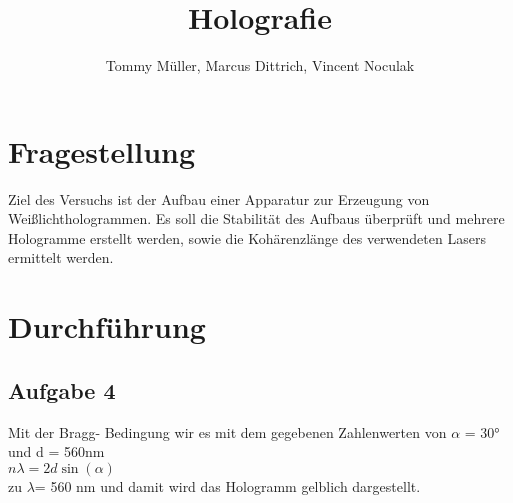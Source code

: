 \documentclass[10pt,a4paper]{article}
\author{Tommy Müller, Marcus Dittrich, Vincent Noculak}
\title{Holografie}
\begin{document}
\section{Fragestellung}

Ziel des Versuchs ist der Aufbau einer Apparatur zur Erzeugung von Weißlichthologrammen. Es soll die Stabilität des Aufbaus überprüft und mehrere Hologramme erstellt werden, sowie die Kohärenzlänge des verwendeten Lasers ermittelt werden.

\section{Durchführung}


\subsection{Aufgabe 4}
Mit der Bragg- Bedingung wir es mit dem gegebenen Zahlenwerten von $\alpha $ = 30° und d = 560nm\\

$n \lambda= 2d \sin(\alpha) $
\\
zu $\lambda$= 560 nm und damit wird das Hologramm gelblich dargestellt.
\end{document}
